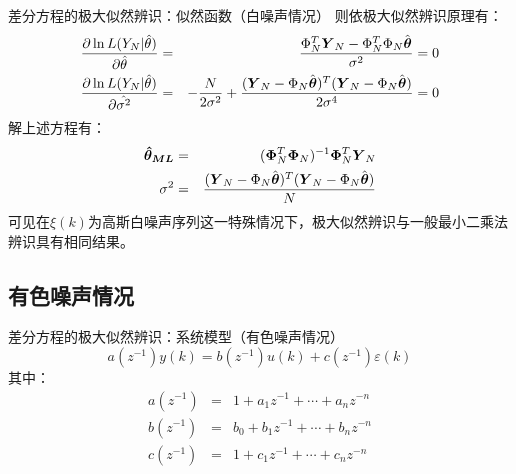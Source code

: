 \begin{frame}{差分方程的极大似然辨识：似然函数（白噪声情况）}
则依极大似然辨识原理有：
\begin{eqnarray*}
\frac{\partial\ln L(Y_N|\hat{\theta})}{\partial\hat{\theta}} &=& \frac{\Phi^T_N\boldsymbol{Y}_N-\Phi^T_N\Phi_N\hat{\boldsymbol{\theta}}}{\sigma^2}=0  \\
\frac{\partial\ln L(Y_N|\hat{\theta})}{\partial\hat{\sigma^2}} &=&-\frac{N}{2\sigma^2}+\frac{(\boldsymbol{Y}_N-\Phi_N\hat{\boldsymbol{\theta}})^T(\boldsymbol{Y}_N-\Phi_N\hat{\boldsymbol{\theta}})}{2\sigma^4}=0
\end{eqnarray*}
解上述方程有：
\begin{eqnarray*}
\boldsymbol{\hat\theta_{ML}} &=& (\boldsymbol{\Phi}^T_N\boldsymbol{\Phi}_N)^{-1}\boldsymbol{\Phi}^T_N\boldsymbol{Y}_N   \\
\sigma^2 &=& \frac{(\boldsymbol{Y}_N-\Phi_N\hat{\boldsymbol{\theta}})^T(\boldsymbol{Y}_N-\Phi_N\hat{\boldsymbol{\theta}})}{N}
\end{eqnarray*}
可见在$\xi(k)$为高斯白噪声序列这一特殊情况下，极大似然辨识与一般最小二乘法辨识具有相同结果。
\end{frame}

\subsection{有色噪声情况}

\begin{frame}{差分方程的极大似然辨识：系统模型（有色噪声情况）}
$$a(z^{-1})y(k) = b (z^{-1})u(k)+c(z^{-1})\varepsilon(k)$$
其中：
\begin{eqnarray*}
a(z^{-1}) &=&  1+a_1z^{-1}+ \cdots +a_n z^{-n} \\
b(z^{-1}) &=&  b_0+b_1z^{-1}+ \cdots +b_n z^{-n} \\
c(z^{-1}) &=&  1+c_1z^{-1}+ \cdots +c_n z^{-n} 
\end{eqnarray*}
\end{frame}

